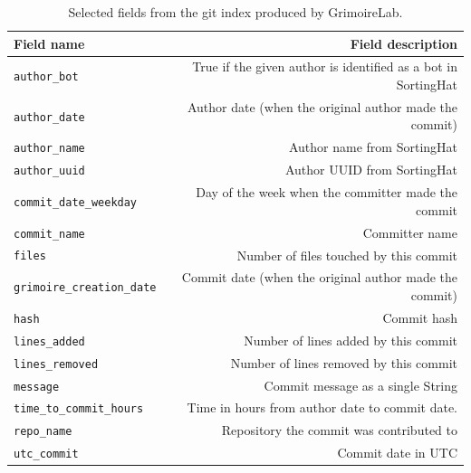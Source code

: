 \documentclass[a4paper, 12pt]{book}
\begin{document}
\begin{table}[b]  %
 \renewcommand{\arraystretch}{1.2}  %
 \begin{center}
  \begin{tabular}{ l  r }
    \toprule    %
      \textbf{Field name} & \textbf{Field description} \\ 
      \midrule %
      \texttt{author\_bot} & True if the given author is identified as a bot in SortingHat \\
      \texttt{author\_date} & Author date (when the original author made the commit) \\
      \texttt{author\_name} & Author name from SortingHat \\
      \texttt{author\_uuid} & Author UUID from SortingHat \\
      \texttt{commit\_date\_weekday} & Day of the week when the committer made the commit \\
      \texttt{commit\_name} & Committer name \\
      \texttt{files} & Number of files touched by this commit \\
      \texttt{grimoire\_creation\_date} & Commit date (when the original author made the commit) \\
      \texttt{hash} & Commit hash \\
      \texttt{lines\_added} & Number of lines added by this commit \\
      \texttt{lines\_removed} & Number of lines removed by this commit \\
      \texttt{message} & Commit message as a single String \\
      \texttt{time\_to\_commit\_hours} & Time in hours from author date to commit date.\\
      \texttt{repo\_name} & Repository the commit was contributed to \\
      \texttt{utc\_commit} & Commit date in UTC \\
    \bottomrule     %
  \end{tabular}
  \caption{Selected fields from the git index produced by GrimoireLab.}
  \label{table:es-git-selected-fields}
 \end{center}
\end{table}
\end{document}
